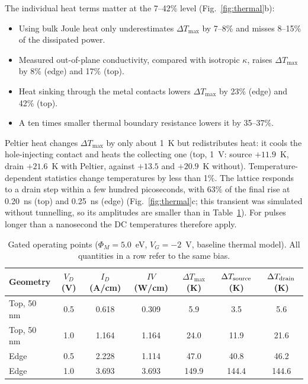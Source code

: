 The individual heat terms matter at the 7--42\% level (Fig.~\ref{fig:thermal}b):
\begin{itemize}
\item Using bulk Joule heat only underestimates $\Delta T_{\max}$ by 7--8\% and misses 8--15\% of the dissipated power.
\item Measured out-of-plane conductivity, compared with isotropic $\kappa$, raises $\Delta T_{\max}$ by 8\% (edge) and 17\% (top).
\item Heat sinking through the metal contacts lowers $\Delta T_{\max}$ by 23\% (edge) and 42\% (top).
\item A ten times smaller thermal boundary resistance lowers it by 35--37\%.
\end{itemize}
Peltier heat changes $\Delta T_{\max}$ by only about 1~K but redistributes heat: it cools the hole-injecting contact and heats the collecting one (top, 1~V: source $+11.9$~K, drain $+21.6$~K with Peltier, against $+13.5$ and $+20.9$~K without). Temperature-dependent statistics change temperatures by less than 1\%. The lattice responds to a drain step within a few hundred picoseconds, with 63\% of the final rise at 0.20~ns (top) and 0.25~ns (edge) (Fig.~\ref{fig:thermal}c; this transient was simulated without tunnelling, so its amplitudes are smaller than in Table~\ref{tab:therm}). For pulses longer than a nanosecond the DC temperatures therefore apply.

\begin{table}[!htbp]
\centering
\caption{Gated operating points ($\Phi_M=5.0$~eV, $V_G=-2$~V, baseline thermal model). All quantities in a row refer to the same bias.}
\label{tab:therm}\small
\begin{tabular}{lcccccc}
\toprule
Geometry & $V_D$ (V) & $I_D$ (A/cm) & $IV$ (W/cm) & $\Delta T_{\max}$ (K) & $\Delta T_{\rm source}$ (K) & $\Delta T_{\rm drain}$ (K) \\
\midrule
Top, 50 nm & 0.5 & 0.618 & 0.309 & 5.9 & 3.5 & 5.6 \\
Top, 50 nm & 1.0 & 1.164 & 1.164 & 24.0 & 11.9 & 21.6 \\
Edge & 0.5 & 2.228 & 1.114 & 47.0 & 40.8 & 46.2 \\
Edge & 1.0 & 3.693 & 3.693 & 149.9 & 144.4 & 144.6 \\
\bottomrule
\end{tabular}
\end{table}
